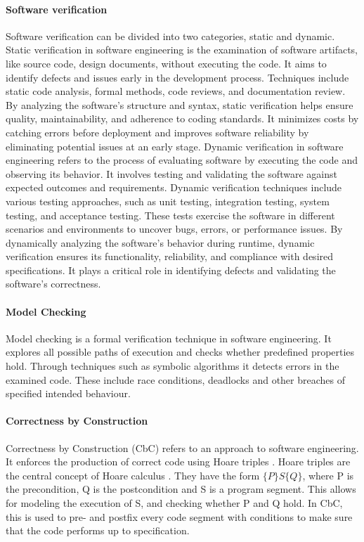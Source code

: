 
\paragraph{Software verification}
Software verification can be divided into two categories, static and dynamic. Static verification in software engineering is the examination of software artifacts, like source code, design documents, without executing the code. It aims to identify defects and issues early in the development process. Techniques include static code analysis, formal methods, code reviews, and documentation review. By analyzing the software's structure and syntax, static verification helps ensure quality, maintainability, and adherence to coding standards. It minimizes costs by catching errors before deployment and improves software reliability by eliminating potential issues at an early stage.
Dynamic verification in software engineering refers to the process of evaluating software by executing the code and observing its behavior. It involves testing and validating the software against expected outcomes and requirements. Dynamic verification techniques include various testing approaches, such as unit testing, integration testing, system testing, and acceptance testing. These tests exercise the software in different scenarios and environments to uncover bugs, errors, or performance issues. By dynamically analyzing the software's behavior during runtime, dynamic verification ensures its functionality, reliability, and compliance with desired specifications. It plays a critical role in identifying defects and validating the software's correctness.
\paragraph{Model Checking}
Model checking is a formal verification technique in software engineering. It explores all possible paths of execution and checks whether predefined properties hold. Through techniques such as symbolic algorithms it detects errors in the examined code. These include race conditions, deadlocks and other breaches of specified intended behaviour.  
\paragraph{Correctness by Construction}
Correctness by Construction (CbC) refers to an approach to software engineering. It enforces the production of correct code using Hoare triples \cite{Runge2019}. Hoare triples are the central concept of Hoare calculus \cite{Hoare1969}. They have the form $\{P\} S \{Q\}$, where P is the precondition, Q is the postcondition and S is a program segment. This allows for modeling the execution of S, and checking whether P and Q hold. In CbC, this is used to pre- and postfix every code segment with conditions to make sure that the code performs up to specification.
